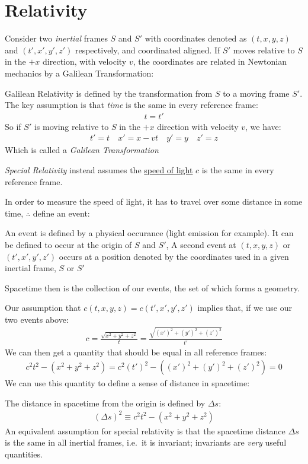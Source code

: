 \section{Relativity}
Consider two \emph{inertial} frames $S$ and $S'$ with coordinates denoted as $(t,x,y,z)$ and $(t',x',y',z')$ respectively, and coordinated aligned. If $S'$ moves relative to $S$ in the $+x$ direction, with velocity $v$, the coordinates are related in Newtonian mechanics by a Galilean Transformation:
\begin{definition}
  Galilean Relativity is defined by the transformation from $S$ to a moving frame $S'$. The key assumption is that \emph{time} is the same in every reference frame:
  \begin{align*}
    t=t'
  \end{align*}
  So if $S'$ is moving relative to $S$ in the $+x$ direction with velocity $v$, we have:
  \begin{align*}
    t'=t\quad x'=x-vt\quad y'=y\quad z'=z
  \end{align*}
  Which is called a \emph{Galilean Transformation}
\end{definition}

\emph{Special Relativity} instead assumes the \underline{speed of light} $c$ is the same in every reference frame.

In order to measure the speed of light, it has to travel over some distance in some time, $\therefore$ define an event:
\begin{definition}[Event]
  An event is defined by a physical occurance (light emission for example). It can be defined to occur at the origin of $S$ and $S'$, A second event at $(t,x,y,z)$ or $(t',x',y',z')$ occurs at a position denoted by the coordinates used in a given inertial frame, $S$ or $S'$
\end{definition}

Spacetime then is the collection of our events, the set of which forms a geometry.

Our assumption that $c(t,x,y,z)=c(t',x',y',z')$ implies that, if we use our two events above:
\begin{gather*}
  c=\frac{\sqrt{x^2+y^2+z^2}}{t}=\frac{\sqrt{(x')^2+(y')^2+(z')^2}}{t'}
\end{gather*}
We can then get a quantity that should be equal in all reference frames:
\begin{align*}
  c^2t^2-(x^2+y^2+z^2)=c^2(t')^2-((x')^2+(y')^2+(z')^2)=0
\end{align*}
We can use this quantity to define a sense of distance in spacetime:
\begin{definition}
  The distance in spacetime from the origin is defined by $\Delta s$:
  \begin{gather*}
    (\Delta s)^2\equiv c^2t^2-(x^2+y^2+z^2)
  \end{gather*}
  An equivalent assumption for special relativity is that the spacetime distance $\Delta s$ is the same in all inertial frames, i.e.\ it is invariant; invariants are \emph{very} useful quantities.
\end{definition}

